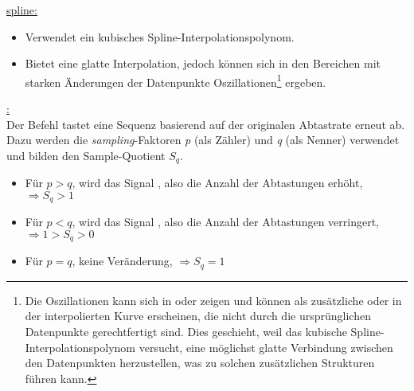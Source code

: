 \begin{enumerate}[label=\alph*)]
	\underline{spline:} \vspace{-12pt}\\
	\begin{itemize}
		\item Verwendet ein kubisches Spline-Interpolationspolynom.
		\item Bietet eine glatte Interpolation, jedoch können sich in den Bereichen mit starken Änderungen der Datenpunkte Oszillationen\footnote{Die Oszillationen kann sich in \grq oder \grq zeigen und können als zusätzliche \grq oder \grq in der interpolierten Kurve erscheinen, die nicht durch die ursprünglichen Datenpunkte gerechtfertigt sind. Dies geschieht, weil das kubische Spline-Interpolationspolynom versucht, eine möglichst glatte Verbindung zwischen den Datenpunkten herzustellen, was zu solchen zusätzlichen Strukturen führen kann.} ergeben. \\
	\end{itemize}
	
	\underline{:}\label{resample} \vspace{4pt}\\
	Der  Befehl tastet eine Sequenz basierend auf der originalen Abtastrate erneut ab. Dazu werden die \textit{sampling}-Faktoren \textit{p} (als Zähler) und \textit{q} (als Nenner) verwendet und bilden den Sample-Quotient $S_q$. 
	\begin{itemize}
		\item Für $p > q$, wird das Signal \grq, also die Anzahl der Abtastungen erhöht, $\Rightarrow S_q > 1$
		\item Für $p < q$, wird das Signal \grq, also die Anzahl der Abtastungen verringert, $\Rightarrow 1 > S_q > 0$ 
		\item Für $p = q$, keine Veränderung, $\Rightarrow S_q = 1$
	\end{itemize}
	\clearpage
	
	\begin{figure}[H]
		\centering
		\renewcommand{\arraystretch}{0.9}
		

\end{figure}
\end{enumerate}
